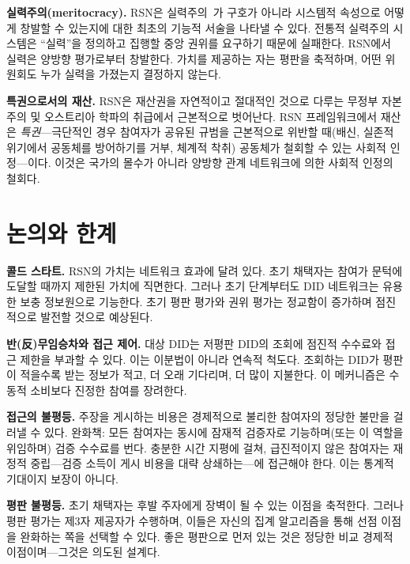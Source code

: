 \documentclass[11pt,a4paper,twocolumn]{article}
\begin{document}
\textbf{실력주의(meritocracy).} RSN은 실력주의~\cite{young1958}가 구호가 아니라 시스템적 속성으로 어떻게 창발할 수 있는지에 대한 최초의 기능적 서술을 나타낼 수 있다. 전통적 실력주의 시스템은 ``실력''을 정의하고 집행할 중앙 권위를 요구하기 때문에 실패한다. RSN에서 실력은 양방향 평가로부터 창발한다. 가치를 제공하는 자는 평판을 축적하며, 어떤 위원회도 누가 실력을 가졌는지 결정하지 않는다.

\textbf{특권으로서의 재산.} RSN은 재산권을 자연적이고 절대적인 것으로 다루는 무정부 자본주의 및 오스트리아 학파의 취급에서 근본적으로 벗어난다. RSN 프레임워크에서 재산은 \emph{특권}---극단적인 경우 참여자가 공유된 규범을 근본적으로 위반할 때(배신, 실존적 위기에서 공동체를 방어하기를 거부, 체계적 착취) 공동체가 철회할 수 있는 사회적 인정---이다. 이것은 국가의 몰수가 아니라 양방향 관계 네트워크에 의한 사회적 인정의 철회다.

\section{논의와 한계}

\textbf{콜드 스타트.} RSN의 가치는 네트워크 효과에 달려 있다. 초기 채택자는 참여가 문턱에 도달할 때까지 제한된 가치에 직면한다. 그러나 초기 단계부터도 DID 네트워크는 유용한 보충 정보원으로 기능한다. 초기 평판 평가와 권위 평가는 정교함이 증가하며 점진적으로 발전할 것으로 예상된다.

\textbf{반(反)무임승차와 접근 제어.} 대상 DID는 저평판 DID의 조회에 점진적 수수료와 접근 제한을 부과할 수 있다. 이는 이분법이 아니라 연속적 척도다. 조회하는 DID가 평판이 적을수록 받는 정보가 적고, 더 오래 기다리며, 더 많이 지불한다. 이 메커니즘은 수동적 소비보다 진정한 참여를 장려한다.

\textbf{접근의 불평등.} 주장을 게시하는 비용은 경제적으로 불리한 참여자의 정당한 불만을 걸러낼 수 있다. 완화책: 모든 참여자는 동시에 잠재적 검증자로 기능하며(또는 이 역할을 위임하며) 검증 수수료를 번다. 충분한 시간 지평에 걸쳐, 급진적이지 않은 참여자는 재정적 중립---검증 소득이 게시 비용을 대략 상쇄하는---에 접근해야 한다. 이는 통계적 기대이지 보장이 아니다.

\textbf{평판 불평등.} 초기 채택자는 후발 주자에게 장벽이 될 수 있는 이점을 축적한다. 그러나 평판 평가는 제3자 제공자가 수행하며, 이들은 자신의 집계 알고리즘을 통해 선점 이점을 완화하는 쪽을 선택할 수 있다. 좋은 평판으로 먼저 있는 것은 정당한 비교 경제적 이점이며---그것은 의도된 설계다.
\end{document}
